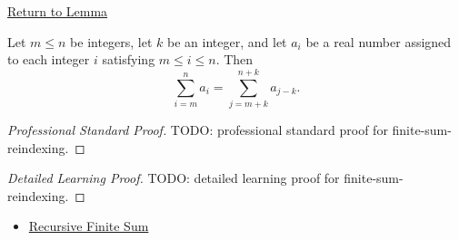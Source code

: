 \newpage
{}
\label{prf:finite-sum-reindexing}

\begin{remark*}[Return]
\hyperref[lem:finite-sum-reindexing]{Return to Lemma}
\end{remark*}

\begin{lemma*}
Let \(m \le n\) be integers, let \(k\) be an integer, and let \(a_i\)
be a real number assigned to each integer \(i\) satisfying \(m \le i
\le n\). Then
\[
  \sum_{i=m}^{n} a_i
  =
  \sum_{j=m+k}^{n+k} a_{j-k}.
\]
\end{lemma*}

\begin{proof}[Professional Standard Proof]
\LRAProofBodyStart
TODO: professional standard proof for finite-sum-reindexing.
\end{proof}

\begin{proof}[Detailed Learning Proof]
\LRAProofBodyStart
TODO: detailed learning proof for finite-sum-reindexing.
\end{proof}

\begin{remark*}
\end{remark*}

\begin{dependencies}
\begin{itemize}
  \item \hyperref[def:recursive-finite-sum]{Recursive Finite Sum}
\end{itemize}
\end{dependencies}

\clearpage
